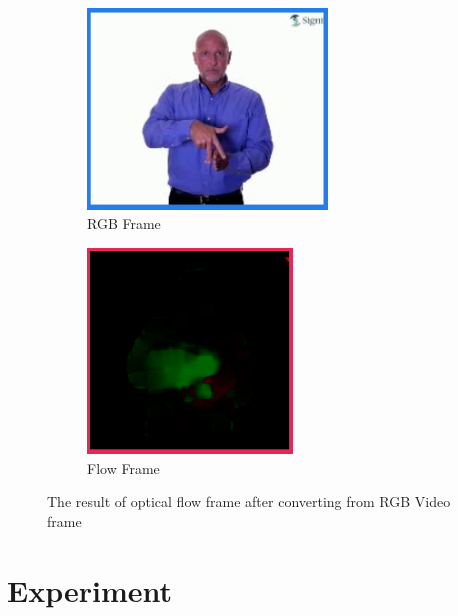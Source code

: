 \documentclass[a4paper, 12pt]{article}
\begin{document}
\begin{figure}[H]
    \centering
    \begin{subfigure}[b]{0.4\textwidth}
        \centering
        \includegraphics[width=0.7\textwidth]{rgb.png}
        \caption{RGB Frame}
    \end{subfigure}
    \hfill
    \begin{subfigure}[b]{0.4\textwidth}
        \centering
        \includegraphics[width=0.6\textwidth]{flow.png}
        \caption{Flow Frame}
    \end{subfigure}
    \caption{The result of optical flow frame after converting from RGB Video frame}
    \label{dense optical flow}
\end{figure}

\newpage

\section{Experiment}
\end{document}
